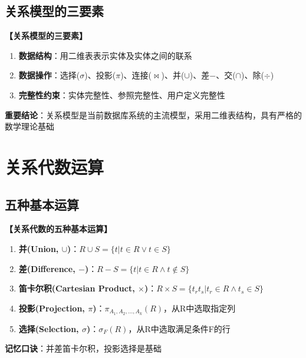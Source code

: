 \documentclass[12pt, a4paper]{article}
\newenvironment{bluebox}[1]{%
  \begin{trivlist}
  \item[\hskip\labelsep \textbf{#1}]
  \setlength{\parskip}{0.5ex}
  \setlength{\itemsep}{0.5ex}
}{%
  \end{trivlist}
}
\begin{document}
\subsection{关系模型的三要素}

\begin{bluebox}{三要素}
	\textbf{【关系模型的三要素】}

	\begin{enumerate}[leftmargin=*, label=\textbf{\arabic*.}]
		\item \textbf{数据结构}：用二维表表示实体及实体之间的联系
		\item \textbf{数据操作}：选择($\sigma$)、投影($\pi$)、连接($\Join$)、并($\cup$)、差$-$、交($\cap$)、除($\div$)
		\item \textbf{完整性约束}：实体完整性、参照完整性、用户定义完整性
	\end{enumerate}

	\textbf{重要结论}：关系模型是当前数据库系统的主流模型，采用二维表结构，具有严格的数学理论基础
\end{bluebox}

\section{关系代数运算}

\subsection{五种基本运算}

\begin{bluebox}{基本运算}
	\textbf{【关系代数的五种基本运算】}

	\begin{enumerate}[leftmargin=*, label=\textbf{\arabic*.}]
		\item \textbf{并(Union, $\cup$)}：$R \cup S = \{t | t \in R \vee t \in S\}$
		\item \textbf{差(Difference, $-$)}：$R - S = \{t | t \in R \wedge t \notin S\}$
		\item \textbf{笛卡尔积(Cartesian Product, $\times$)}：$R \times S = \{t_r t_s | t_r \in R \wedge t_s \in S\}$
		\item \textbf{投影(Projection, $\pi$)}：$\pi_{A_1,A_2,...,A_k}(R)$，从R中选取指定列
		\item \textbf{选择(Selection, $\sigma$)}：$\sigma_F(R)$，从R中选取满足条件F的行
	\end{enumerate}

	\textbf{记忆口诀}：并差笛卡尔积，投影选择是基础
\end{bluebox}
\end{document}

